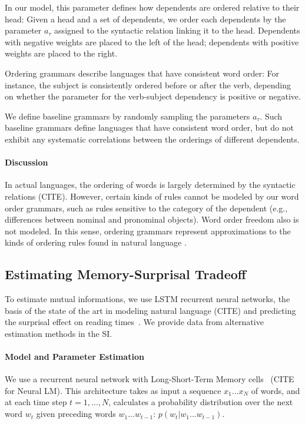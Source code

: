 \documentclass[11pt,letterpaper]{article}
\begin{document}
In our model, this parameter defines how dependents are ordered relative to their head:
Given a head and a set of dependents, we order each dependents by the parameter $a_\tau$ assigned to the syntactic relation linking it to the head.
Dependents with negative weights are placed to the left of the head; dependents with positive weights are placed to the right.

Ordering grammars describe languages that have consistent word order:
For instance, the subject is consistently ordered before or after the verb, depending on whether the parameter for the verb-subject dependency is positive or negative.

We define baseline grammars by randomly sampling the parameters $a_\tau$.
Such baseline grammars define languages that have consistent word order, but do not exhibit any systematic correlations between the orderings of different dependents.



\paragraph{Discussion}
In actual languages, the ordering of words is largely determined by the syntactic relations (CITE).
However, certain kinds of rules cannot be modeled by our word order grammars, such as rules sensitive to the category of the dependent (e.g., differences between nominal and pronominal objects).
Word order freedom also is not modeled.
In this sense, ordering grammars represent approximations to the kinds of ordering rules found in natural language \cite{gildea-optimizing-2007, gildea-grammars-2010, gildea-human-2015}.



\subsection{Estimating Memory-Surprisal Tradeoff}\label{sec:method}
To estimate mutual informations, we use LSTM recurrent neural networks, the basis of the state of the art in modeling natural language (CITE) and predicting the surprisal effect on reading times~\citep{frank-insensitivity-2011, goodkind-predictive-2018}.
We provide data from alternative estimation methods in the SI.



\paragraph{Model and Parameter Estimation}
We use a recurrent neural network with Long-Short-Term Memory cells~\citep{hochreiter-long-1997} (CITE for Neural LM).
This architecture takes as input a sequence $x_1 ... x_N$ of words, and at each time step $t=1, ..., N$, calculates a probability distribution over the next word $w_{t}$ given preceding words $w_1 ... w_{t-1}$: $p(w_t|w_1...w_{t-1})$.
\end{document}
